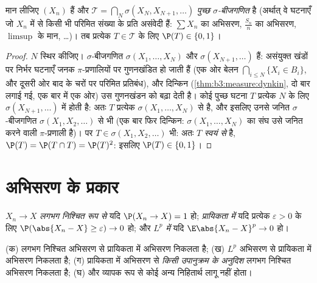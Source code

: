 \begin{theorem}[कोल्मोगोरोव का शून्य--एक नियम]
\label{thm:b3:probability:zeroone}
मान लीजिए $(X_n)$  हैं और $\mathcal T =
\bigcap_N\sigma(X_N, X_{N+1}, \dots)$ \emph{पुच्छ
$\sigma$-बीजगणित} है (अर्थात् वे घटनाएँ जो
$X_n$ में से किसी भी परिमित संख्या के प्रति असंवेदी हैं: $\sum X_n$ का
अभिसरण, $\frac{S_n}n$ का अभिसरण, $\limsup$ के मान, \dots)। तब प्रत्येक $T \in \mathcal T$
के लिए $\P(T) \in \{0,
1\}$।
\end{theorem}

\begin{proof}
$N$ स्थिर कीजिए। $\sigma$-बीजगणित $\sigma(X_1, \dots, X_N)$ और $\sigma(X_{N+1}, \dots)$  हैं:
असंयुक्त खंडों पर निर्भर घटनाएँ जनक $\pi$-प्रणालियों पर गुणनखंडित
हो जाती हैं (एक ओर बेलन $\bigcap_{i\leq N}\{X_i \in B_i\}$, और दूसरी ओर बाद के चरों पर परिमित
प्रतिबंध), और दिन्किन (\cref{thm:b3:measure:dynkin}, दो बार लगाई गई, एक बार में एक ओर) उस
गुणनखंडन को बढ़ा देती है। कोई पुच्छ घटना $T$ प्रत्येक $N$ के
लिए $\sigma(X_{N+1}, \dots)$ में होती है: अतः $T$ प्रत्येक $\sigma(X_1, \dots, X_N)$ से  है, और
इसलिए उनसे जनित $\sigma$-बीजगणित $\sigma(X_1, X_2, \dots)$ से भी (एक बार फिर दिन्किन:
$\sigma(X_1,\dots,X_N)$ का संघ उसे जनित करने वाली $\pi$-प्रणाली है)। पर $T \in \sigma(X_1, X_2, \dots)$ भी:
अतः $T$ \emph{स्वयं से}  है, $\P(T) = \P(T\cap T) =
\P(T)^2$: इसलिए $\P(T) \in \{0, 1\}$।
\end{proof}

\section{अभिसरण के प्रकार}

\begin{definition}\label{def:b3:probability:modes}
$X_n \to X$ \emph{लगभग निश्चित रूप से} यदि $\P(X_n \to X) = 1$ हो; \emph{प्रायिकता में}
यदि प्रत्येक $\varepsilon > 0$ के लिए $\P(\abs{X_n - X} \geq \varepsilon)
\to 0$ हो; और \emph{$L^p$ में} यदि $\E\abs{X_n - X}^p \to 0$
हो।
\end{definition}

\begin{proposition}\label{prop:b3:probability:modes}
(क) लगभग निश्चित अभिसरण से प्रायिकता में अभिसरण निकलता है;
(ख) $L^p$ अभिसरण से प्रायिकता में अभिसरण निकलता है;
(ग) प्रायिकता में अभिसरण से \emph{किसी उपानुक्रम के अनुदिश} लगभग
निश्चित अभिसरण निकलता है;
(घ) और व्यापक रूप से कोई अन्य निहितार्थ लागू नहीं होता।
\end{proposition}

